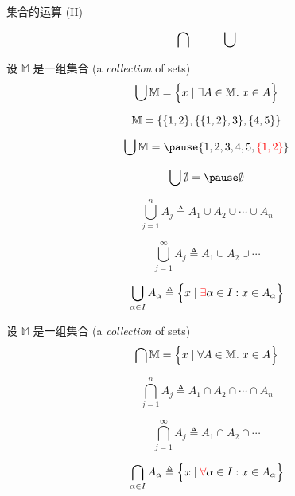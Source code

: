 
\begin{frame}{}
  \begin{center}
    {\Large 集合的运算 (II)}
  \end{center}

  \[
    \text{\Large $\bigcap \qquad \bigcup$}
  \]
\end{frame}

\begin{frame}{}
  \begin{definition}
    设 $\mathbb{M}$ 是一组集合 (a {\it collection} of sets)
    \[
      \bigcup \mathbb{M} = \Big\{x \mid \exists A \in \mathbb{M}.\; x \in A\Big\}
    \]
  \end{definition}

  \pause
  \[
    \mathbb{M} = \{\{1, 2\}, \{\{1, 2\}, 3\}, \{4, 5\}\}
  \]

  \pause
  \[
    \bigcup \mathbb{M} = \pause\set{1, 2, 3, 4, 5, \red{\set{1, 2}}}
  \]

  \pause
  \[
    \bigcup \emptyset = \pause \emptyset
  \]
\end{frame}

\begin{frame}{}
  \[
    \bigcup_{j = 1}^{n} A_j \triangleq A_1 \cup A_2 \cup \cdots \cup A_n
  \]

  \pause
  \vspace{0.50cm}
  \[
    \bigcup_{j = 1}^{\infty} A_j \triangleq A_1 \cup A_2 \cup \cdots
  \]

  \pause
  \vspace{0.50cm}
  \[
    \bigcup_{\alpha \in I} A_{\alpha} \triangleq \Big\{x \mid \textcolor{red}{\exists} \alpha \in I: x \in A_{\alpha}\Big\}
  \]
\end{frame}

\begin{frame}{}
  \begin{definition}
    设 $\mathbb{M}$ 是一组集合 (a {\it collection} of sets)
    \[
      \bigcap \mathbb{M} = \Big\{x \mid \forall A \in \mathbb{M}.\; x \in A\Big\}
    \]
  \end{definition}
\end{frame}

\begin{frame}{}
  \[
    \bigcap_{j = 1}^{n} A_j \triangleq A_1 \cap A_2 \cap \cdots \cap A_n
  \]

  \pause
  \vspace{0.50cm}
  \[
    \bigcap_{j = 1}^{\infty} A_j \triangleq A_1 \cap A_2 \cap \cdots
  \]

  \pause
  \vspace{0.50cm}
  \[
    \bigcap_{\alpha \in I} A_{\alpha} \triangleq \Big\{x \mid \textcolor{red}{\forall} \alpha \in I: x \in A_{\alpha}\Big\}
  \]
\end{frame}

